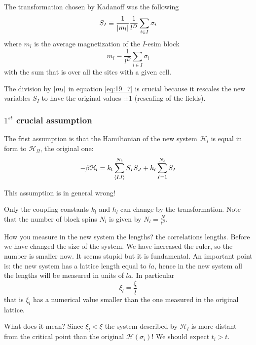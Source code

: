 \documentclass[../main/main.tex]{subfiles}
\begin{document}
The transformation chosen by Kadanoff was the following
\begin{equation}
  S_I \equiv \frac{1}{\abs{m_l} } \frac{1}{l^D} \sum_{i \in I}^{}  \sigma _i
  \label{eq:19_7}
\end{equation}
where \( m_l \) is the average magnetization of the \( I \)-esim block
\begin{equation}
  m_l \equiv \frac{1}{l^D} \sum_{i \in I}^{} \sigma _i
\end{equation}
with the sum that is over all the sites with a given cell.
\begin{remark}
The division by \( \abs{m_l}  \) in equation \eqref{eq:19_7} is crucial because it rescales the new variables \( S_I \) to have the original values \( \pm 1 \) (rescaling of the fields).
\end{remark}

\subsubsection{\(  1^{st} \) crucial assumption}
The frist assumption is that the Hamiltonian of the new system \( \mathcal{H}_l \) is equal in form to \( \mathcal{H}_ \Omega  \), the original one:
\begin{equation}
  - \beta \mathcal{H}_l = k_l \sum_{\expval{IJ} }^{N_b} S_I S_J  + h_l \sum_{I=1}^{N_b} S_I
\end{equation}
\begin{remark}
This assumption is in general wrong!
\end{remark}
Only the coupling constants \( k_l \) and \( h_l \) can change by the transformation. Note that the number of block spins \( N_l \) is given by \(   N_l = \frac{N}{l^D} \).

How you measure in the new system the lengths? the correlations lengths. Before we have changed the size of the system. We have increased the ruler, so the number is smaller now. It seems stupid but it is fundamental.
An important point is: the new system has a lattice length equal to \( la \), hence in the new system all the lengths will be measured in units of \( la \). In particular
\begin{equation}
  \xi _l = \frac{\xi }{l}
\end{equation}
that is \( \xi _l \) has a numerical value smaller than the one measured in the original lattice.

What does it mean? Since \( \xi _l < \xi  \) the system described by \( \mathcal{H}_l \)   is more distant from the critical point than the original \( \mathcal{H} (\sigma _i) \)! We should expect \( t_l > t \).
\end{document}

